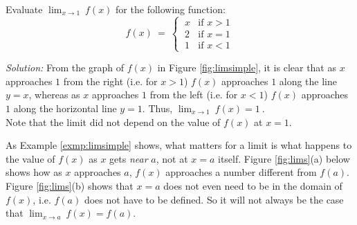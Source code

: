 \begin{exmp}\label{exmp:limsimple}
 \piccaption[]{\label{fig:limsimple}}
\noindent Evaluate $\displaystyle\lim_{x \to 1}~f(x)$ for the following function:
\[
 f(x) ~=~ \begin{cases}
           ~x & \text{if } x > 1\\
           ~2 & \text{if } x = 1\\
           ~1 & \text{if } x < 1
          \end{cases}
\]
\par\noindent\emph{Solution:} From the graph of $f(x)$ in Figure \ref{fig:limsimple},
it is clear that as $x$ approaches $1$ from the right (i.e. for $x > 1$) $f(x)$
approaches $1$ along the line $y = x$, whereas as $x$ approaches $1$ from the
left (i.e. for $x < 1$) $f(x)$ approaches $1$ along the horizontal line $y = 1$.
Thus, $\displaystyle\lim_{x \to 1}~f(x) = 1~$.\\
Note that the limit did not depend on the value of $f(x)$ at $x = 1$.
\end{exmp}
\divider
\vspace{3mm}

As Example \ref{exmp:limsimple} shows, what matters for a limit is what happens
to the value of $f(x)$ as $x$ gets
\emph{near} $a$, not at $x=a$ itself. Figure \ref{fig:lims}(a) below shows how
as $x$ approaches $a$, $f(x)$ approaches a number different from $f(a)$. Figure
\ref{fig:lims}(b) shows that $x=a$ does not even need to be in the domain of
$f(x)$, i.e. $f(a)$ does not have to be defined. So it will not always
be the case that $\displaystyle\lim_{x \to a} ~f(x) = f(a)$.

